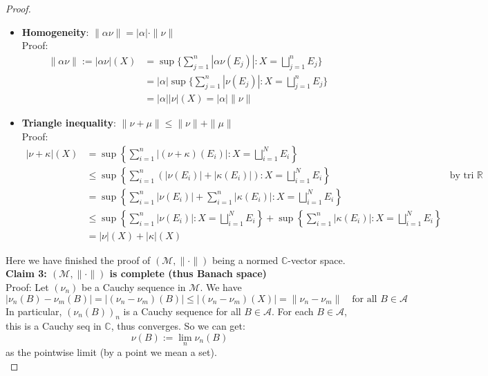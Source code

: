 \documentclass[lang=cn,11pt]{elegantbook}
\begin{document}
\begin{proof}
\begin{itemize}
Conversely, if $\nu = 0$ then \[ \|\nu \| := 
|\nu|(X) =     \sup\{\sum_{j=1}^n|\nu(E_j)| :X=\bigsqcup_{j=1}^nE_j\} = \sup \{ 0 \} = 0
\]finishing the proof that $\|\nu\|=0 \Longleftrightarrow \nu=0$
    \item \textbf{Homogeneity}: $\|\alpha \nu\|=|\alpha| \cdot\|\nu\|$\\
Proof: \begin{align*}
 \| \alpha \nu \| := 
|\alpha \nu|(X) &=     \sup\{\sum_{j=1}^n|\alpha \nu(E_j)| :X=\bigsqcup_{j=1}^nE_j\} \\
&= |\alpha|\sup \{\sum_{j=1}^n| \nu(E_j)| :X=\bigsqcup_{j=1}^nE_j\}\\
& =|\alpha| |\nu | (X)  = |\alpha|\| \nu \|
\end{align*}
    \item \textbf{Triangle inequality}: $\|\nu+\mu\| \leq\|\nu\|+\|\mu\|$\\
Proof: 
\begin{align*}
    |\nu + \kappa|(X) &=\sup \left\{ \sum_{i=1}^n |(\nu + \kappa)(E_i)| 
 : X= \bigsqcup_{i=1}^N E_i \right\} \\
    & \leq \sup \left\{ \sum_{i=1}^n (|\nu(E_i)| +|\kappa(E_i)|)  
 : X= \bigsqcup_{i=1}^N E_i \right\} \quad &\text{by tri ineq in } \mathbb{R}           \\
 & =  \sup \left\{ \sum_{i=1}^n |\nu(E_i)| +  \sum_{i=1}^n|\kappa(E_i)|  
 : X= \bigsqcup_{i=1}^N E_i \right\}       \\
 &\leq \sup \left\{ \sum_{i=1}^n |\nu(E_i)| 
 : X= \bigsqcup_{i=1}^N E_i \right\} + \sup \left\{ \sum_{i=1}^n |\kappa(E_i)|
 : X= \bigsqcup_{i=1}^N E_i \right\}\\
 &= |\nu|(X)+|\kappa|(X) 
\end{align*}
\end{itemize}
Here we have finished the proof of $(\mathcal{M}, \| \cdot \|)$ being a normed $\mathbb{C}$-vector space.\\
\textbf{Claim 3: $(\mathcal{M}, \| \cdot \|)$ is complete (thus Banach space)}\\
Proof: 
Let $(\nu_n)$ be a Cauchy sequence in $\mathcal{M}$. We have
\[
|\nu_n(B) - \nu_m(B)| = |(\nu_n - \nu_m)(B)| \leq  |(\nu_n - \nu_m)(X)| =   \|\nu_n - \nu_m\| \quad \text{for all } B \in \mathcal{A}
\]
In particular, $(\nu_n(B))_n$ is a Cauchy sequence for all $B \in \mathcal{A}$. For each $B \in \mathcal{A}$, this is a Cauchy seq in $\mathbb{C}$, thus converges. So we can get: \[
\nu(B) := \lim_n \nu_n(B)
\]
as the pointwise limit (by a point we mean a set).\\

\end{proof}
\end{document}
